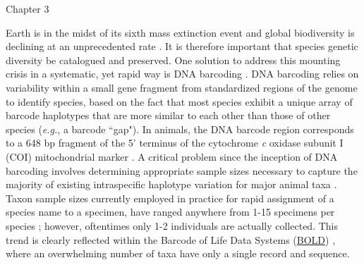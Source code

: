Chapter 3

Earth is in the midst of its sixth mass extinction event and global biodiversity is \\ declining at an unprecedented rate \cite{ceballos2015accelerated}. It is therefore important that species genetic \\ diversity be catalogued and preserved. One solution to address this mounting crisis in a systematic, yet rapid way is DNA barcoding \cite{hebert2003biological}. DNA barcoding relies on variability within a small gene fragment from standardized regions of the genome to identify species, based on the fact that most species exhibit a unique array of barcode haplotypes that are more similar to each other than those of other species (\textit{e.g.}, a barcode ``gap"). In animals, the DNA barcode region corresponds to a 648 bp fragment of the 5' terminus of the cytochrome \textit{c} oxidase subunit I (COI) mitochondrial marker \cite{hebert2003biological, hebert2003barcoding}. A critical problem since the inception of DNA barcoding involves determining appropriate sample sizes necessary to capture the majority of existing intraspecific haplotype variation for major animal taxa \cite{hebert2004identification, meyer2005dna, ward2005dna}. Taxon sample sizes currently employed in practice for rapid assignment of a species name to a specimen, have ranged anywhere from 1-15 specimens per species \cite{goodall2012comparison, jin2012simple, matz2005likelihood, ross2008testing, yao2017evaluating}; however, oftentimes only 1-2 individuals are actually collected. This trend is clearly reflected within the Barcode of Life Data Systems (\href{http://www.boldsystems.org}{BOLD}) \cite{ratnasingham2007bold}, where an overwhelming number of taxa have only a single record and sequence.

 

